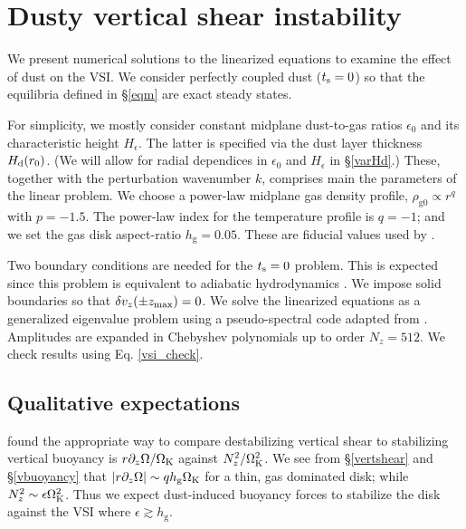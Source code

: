 \section{
  Dusty vertical shear instability}\label{results} 



We present numerical solutions to the linearized
equations to examine the effect of dust on the VSI. 
We consider perfectly coupled dust ($t_\mathrm{s}=0$) so that the 
equilibria defined in \S\ref{eqm} are exact steady states. 

For simplicity, we mostly consider constant midplane
dust-to-gas ratios $\epsilon_0$ and its characteristic height
$H_\epsilon$. The latter is specified via the dust layer thickness
$H_\mathrm{d}(r_0)$. (We will allow for radial dependices in $\epsilon_0$ and
$H_\epsilon$ in \S\ref{varHd}.)   
These, together with the perturbation wavenumber $k$, comprises main the
parameters of the linear problem. We choose a power-law 
midplane gas density profile, $\rho_\mathrm{g0}\propto r^q$ with $p =
-1.5$. The power-law index for the 
temperature profile is $q=-1$; and we set the gas disk aspect-ratio
$h_\mathrm{g}=0.05$. These are fiducial values used by 
\citet[][ in this section]{lin15}. 

Two boundary conditions are needed for the $t_\mathrm{s}=0$
problem. This is expected since this problem is equivalent to
adiabatic hydrodynamics \citep[e.g.][]{lubow93}. We 
impose solid boundaries so that $\delta v_z(\pm z_\mathrm{max})=0$.  
We solve the linearized equations as a generalized eigenvalue problem 
using a pseudo-spectral code adapted from \cite{lin15}. Amplitudes 
are expanded in Chebyshev polynomials up to order $N_z=512$. We check
results using Eq. \ref{vsi_check}.    

\subsection{Qualitative expectations}\label{vsi_est}
\cite{lin15} found the appropriate way to compare 
destabilizing vertical shear to stabilizing vertical buoyancy is
$r\partial_z\Omega/\Omega_{\rm K}$ against $N_z^2/\Omega_{\rm K}^2$. We see from \S\ref{vertshear}
and \S\ref{vbuoyancy} that $|r\partial_z\Omega|\sim q h_\mathrm{g}\Omega_{\rm K}$ for a
thin, gas dominated disk; while $N_z^2\sim \epsilon\Omega_{\rm K}^2$. Thus we
expect dust-induced buoyancy forces to stabilize the disk against the
VSI where $\epsilon \gtrsim h_\mathrm{g}$. 

